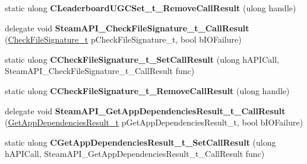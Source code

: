 \begin{DoxyCompactItemize}
\item 
\mbox{\label{class_valve_1_1_interop_1_1_native_entrypoints_a4cdd2b2826bfc8f9eb1f94fea335800d}} 
static ulong {\bfseries C\+Leaderboard\+U\+G\+C\+Set\+\_\+t\+\_\+\+Remove\+Call\+Result} (ulong handle)
\item 
\mbox{\label{class_valve_1_1_interop_1_1_native_entrypoints_a33b6073c014e808181592be20b27b458}} 
delegate void {\bfseries Steam\+A\+P\+I\+\_\+\+Check\+File\+Signature\+\_\+t\+\_\+\+Call\+Result} (\hyperlink{struct_valve_1_1_steamworks_1_1_check_file_signature__t}{Check\+File\+Signature\+\_\+t} p\+Check\+File\+Signature\+\_\+t, bool b\+I\+O\+Failure)
\item 
\mbox{\label{class_valve_1_1_interop_1_1_native_entrypoints_a47b7e8759a44a2587ea60124be6058a3}} 
static ulong {\bfseries C\+Check\+File\+Signature\+\_\+t\+\_\+\+Set\+Call\+Result} (ulong h\+A\+P\+I\+Call, Steam\+A\+P\+I\+\_\+\+Check\+File\+Signature\+\_\+t\+\_\+\+Call\+Result func)
\item 
\mbox{\label{class_valve_1_1_interop_1_1_native_entrypoints_ad05c1c23b34c7be809e481c093003b19}} 
static ulong {\bfseries C\+Check\+File\+Signature\+\_\+t\+\_\+\+Remove\+Call\+Result} (ulong handle)
\item 
\mbox{\label{class_valve_1_1_interop_1_1_native_entrypoints_a864119dd886b9e71236987c4d1ec8982}} 
delegate void {\bfseries Steam\+A\+P\+I\+\_\+\+Get\+App\+Dependencies\+Result\+\_\+t\+\_\+\+Call\+Result} (\hyperlink{struct_valve_1_1_steamworks_1_1_get_app_dependencies_result__t}{Get\+App\+Dependencies\+Result\+\_\+t} p\+Get\+App\+Dependencies\+Result\+\_\+t, bool b\+I\+O\+Failure)
\item 
\mbox{\label{class_valve_1_1_interop_1_1_native_entrypoints_a64b8d4203e150cce7101ddfb4240a903}} 
static ulong {\bfseries C\+Get\+App\+Dependencies\+Result\+\_\+t\+\_\+\+Set\+Call\+Result} (ulong h\+A\+P\+I\+Call, Steam\+A\+P\+I\+\_\+\+Get\+App\+Dependencies\+Result\+\_\+t\+\_\+\+Call\+Result func)
\item 

\end{DoxyCompactItemize}
